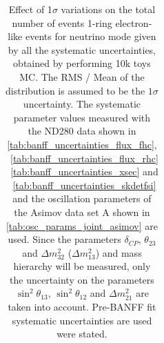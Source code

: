 \begin{table}[htb]
\begin{tabular}{| c | c | c |}
\end{tabular}
\caption{
 Effect of 1$\sigma$ variations on the total number of events 1-ring electron-like events for neutrino mode
 given by all the systematic uncertainties, obtained by performing 10k toys MC.
The RMS / Mean of the distribution is assumed to be the $1\sigma$ uncertainty.
The systematic parameter values measured with the ND280 data 
shown in 
\cref{tab:banff_uncertainties_flux_fhc},
~\ref{tab:banff_uncertainties_flux_rhc}
~\ref{tab:banff_uncertainties_xsec}
and
~\ref{tab:banff_uncertainties_skdetfsi}
and the oscillation parameters of the Asimov data set A shown in \cref{tab:osc_params_joint_asimov}
are used.
Since the parameters $\delta_{CP}$, $\theta_{23}$ and $\Delta m^2_{32}$ ($\Delta m^2_{13}$) and mass hierarchy
will be measured,
only the uncertainty on the parameters 
$\sin^2 \theta_{13}$,
$\sin^2 \theta_{12}$
and 
$\Delta m^2_{21}$ 
are taken into account.
Pre-BANFF fit systematic uncertainties are used were stated.
}                                                                                                                                                                                          
\label{tab:nsk_systematic_table_summary_joint_asimov_A_fhc_elike}
\end{table}





